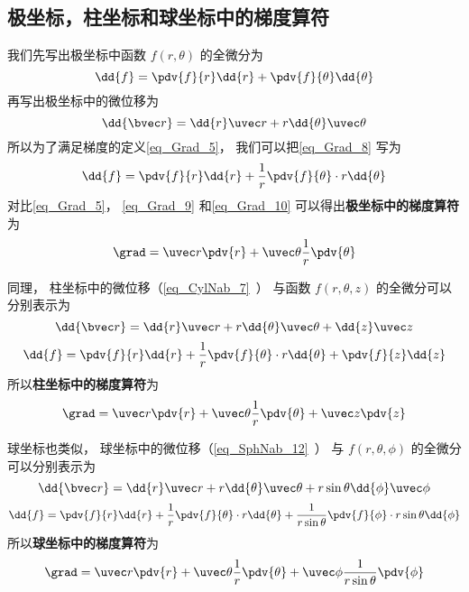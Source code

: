 \subsection{极坐标，柱坐标和球坐标中的梯度算符}\label{sub_Grad_1}

我们先写出极坐标中函数 $f(r,\theta)$ 的全微分为
\begin{equation}\label{eq_Grad_8}
\dd{f} = \pdv{f}{r} \dd{r} + \pdv{f}{\theta} \dd{\theta}
\end{equation}
再写出极坐标中的微位移为
\begin{equation}\label{eq_Grad_9}
\dd{\bvec r} = \dd{r} \uvec r + r \dd{\theta} \uvec \theta
\end{equation}
所以为了满足梯度的定义\autoref{eq_Grad_5}， 我们可以把\autoref{eq_Grad_8} 写为
\begin{equation}\label{eq_Grad_10}
\dd{f} = \pdv{f}{r} \dd{r} + \frac1r \pdv{f}{\theta} \cdot r\dd{\theta}
\end{equation}
对比\autoref{eq_Grad_5}， \autoref{eq_Grad_9} 和\autoref{eq_Grad_10} 可以得出\textbf{极坐标中的梯度算符}为
\begin{equation}
\grad = \uvec r \pdv{r} + \uvec \theta \frac1r \pdv{\theta}
\end{equation}

同理， 柱坐标中的微位移（\autoref{eq_CylNab_7}~） 与函数 $f(r,\theta, z)$ 的全微分可以分别表示为
\begin{equation}
\dd{\bvec r} = \dd{r} \uvec r + r\dd{\theta} \uvec \theta + \dd{z} \uvec z
\end{equation}
\begin{equation}
\dd{f} = \pdv{f}{r} \dd{r} + \frac1r \pdv{f}{\theta} \cdot  r\dd{\theta} + \pdv{f}{z} \dd{z}
\end{equation}
所以\textbf{柱坐标中的梯度算符}为
\begin{equation}
\grad = \uvec r \pdv{r} + \uvec \theta \frac1r \pdv{\theta} + \uvec z \pdv{z}
\end{equation}

球坐标也类似， 球坐标中的微位移（\autoref{eq_SphNab_12}~） 与 $f(r,\theta,\phi)$ 的全微分可以分别表示为
\begin{equation}
\dd{\bvec r} = \dd{r}\uvec r + r\dd{\theta} \uvec \theta + r\sin\theta\dd{\phi}\uvec \phi
\end{equation}
\begin{equation}
\dd{f} = \pdv{f}{r} \dd{r} + \frac1r \pdv{f}{\theta} \cdot r\dd{\theta} + \frac{1}{ r\sin\theta} \pdv{f}{\phi} \cdot r\sin\theta\dd{\phi}
\end{equation}
所以\textbf{球坐标中的梯度算符}为
\begin{equation}
\grad = \uvec r \pdv{r} + \uvec \theta \frac1r \pdv{\theta} + \uvec \phi \frac{1}{ r\sin\theta} \pdv{\phi}
\end{equation}

